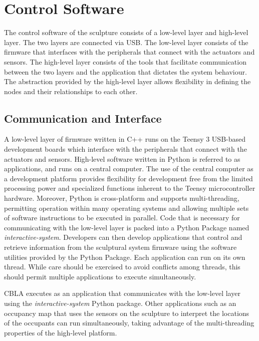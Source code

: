 \FloatBarrier
\section{Control Software}

The control software of the sculpture consists of a low-level layer and high-level layer. The two layers are connected via USB. The low-level layer consists of the firmware that interfaces with the peripherals that connect with the actuators and sensors. The high-level layer consists of the tools that facilitate communication between the two layers and the application that dictates the system behaviour. The abstraction provided by the high-level layer allows flexibility in defining the nodes and their relationships to each other. 

\subsection{Communication and Interface}

A low-level layer of firmware written in C++ runs on the Teensy 3 USB-based development boards which interface with the peripherals that connect with the actuators and sensors. High-level software written in Python is referred to as applications, and runs on a central computer. The use of the central computer as a development platform provides flexibility for development free from the limited processing power and specialized functions inherent to the Teensy microcontroller hardware. Moreover, Python is cross-platform and supports multi-threading, permitting operation within many operating systems and allowing multiple sets of software instructions to be executed in parallel. Code that is necessary for communicating with the low-level layer is packed into a Python Package named \textit{interactive-system}. Developers can then develop applications that control and retrieve information from the sculptural system firmware using the software utilities provided by the Python Package. Each application can run on its own thread. While care should be exercised to avoid conflicts among threads, this should permit multiple applications to execute simultaneously.	

CBLA executes as an application that communicates with the low-level layer using the \textit{interactive-system} Python package. Other applications such as an occupancy map that uses the sensors on the sculpture to interpret the locations of the occupants can run simultaneously, taking advantage of the multi-threading properties of the high-level platform.

